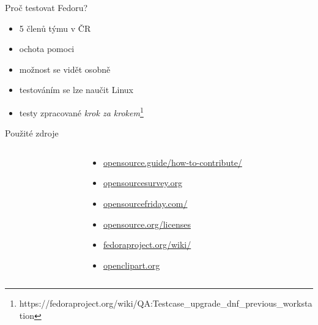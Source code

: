 \documentclass[11pt]{beamer}
\begin{document}
\begin{frame}{Proč testovat Fedoru?}
	\begin{itemize}
		\item 5 členů týmu v ČR
		\item ochota pomoci
		\item možnost se vidět osobně
		\item testováním se lze naučit Linux
		\item testy zpracované \textit{krok za krokem}\footnote{https://fedoraproject.org/wiki/QA:Testcase\_upgrade\_dnf\_previous\_workstation}
	\end{itemize}
\end{frame}

 \begin{frame}{Použité zdroje}
		\begin{columns}[T]
	 		\begin{column}{0.5\textwidth}
			\end{column}
 		\begin{column}{0.5\textwidth}
 		\begin{itemize}
 		\item \url{opensource.guide/how-to-contribute/}
 		\item \url{opensourcesurvey.org}
 		\item \url{opensourcefriday.com/}
 		\item \url{opensource.org/licenses}
 		\item \url{fedoraproject.org/wiki/}
 		\item \url{openclipart.org}
		 \end{itemize}
	\end{column}
 	\end{columns}
\end{frame}
\end{document}
